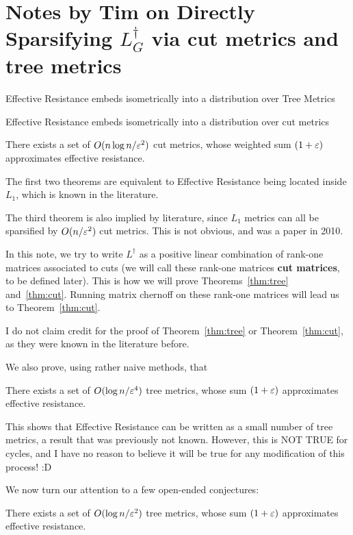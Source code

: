 
\usepackage{float}

\section{Notes by Tim on Directly Sparsifying $L_G^\dag$ via cut metrics
and tree metrics}
\begin{theorem}\label{thm:tree} Effective Resistance embeds
  isometrically into a distribution over
Tree Metrics \end{theorem}
\begin{theorem}\label{thm:cut} Effective Resistance embeds isometrically
 into a distribution over cut
metrics \end{theorem}
\begin{theorem}\label{thm:lowcut} There exists a set of $O(n \log n /
  \varepsilon^2)$ cut metrics, whose weighted sum $(1+\varepsilon)$ approximates effective resistance.
\end{theorem}

The first two theorems are equivalent to Effective Resistance being
located inside $L_1$, which is known in the literature. 

The third theorem is also implied by literature, since $L_1$ metrics can
all be sparsified by $O(n / \varepsilon^2)$ cut metrics. This is not obvious,
and was a paper in 2010.

In this note, we try to write $L^\dag$ as a positive linear combination of
rank-one matrices associated to
cuts (we will call these rank-one matrices \textbf{cut matrices}, to be
defined later). This is how we will prove Theorems~\ref{thm:tree}
and~\ref{thm:cut}. Running matrix chernoff on these rank-one matrices
will lead us to Theorem~\ref{thm:cut}.

I do not claim credit for the proof of Theorem~\ref{thm:tree} or
Theorem~\ref{thm:cut}, as they were known in the literature before.

We also prove, using rather naive methods, that
\begin{conjecture}\label{thm:hightree} There exists a set of
  $O( \log n / \varepsilon^4)$ tree
  metrics, whose sum $(1+\varepsilon)$ approximates effective resistance.
\end{conjecture}
This shows that Effective Resistance can be written as a small number of
tree metrics, a result that was previously not known. However, this is
NOT TRUE for cycles, and I have no reason to believe it will be true for
any modification of this process! :D

We now turn our attention to a few open-ended conjectures:
\begin{conjecture}\label{conj:lowtree} There exists a set of $O( \log n / \varepsilon^2)$ tree
  metrics, whose sum $(1+\varepsilon)$ approximates effective resistance.
\end{conjecture}

